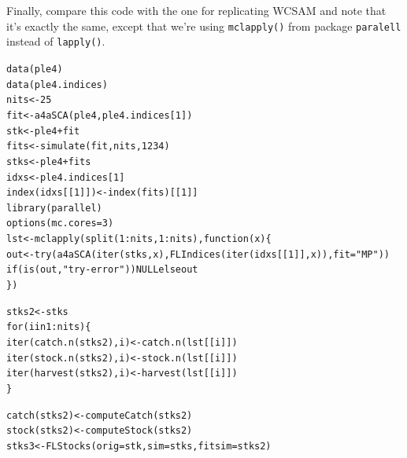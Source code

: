 \documentclass[a4paper,english,10pt]{article}\usepackage[]{graphicx}\usepackage[]{color}
\makeatletter
\newcommand{\hlnum}[1]{\textcolor[rgb]{0.2,0.2,0.2}{#1}}%
\newcommand{\hlstr}[1]{\textcolor[rgb]{0.2,0.2,0.2}{#1}}%
\newcommand{\hlopt}[1]{\textcolor[rgb]{0.2,0.2,0.2}{#1}}%
\newcommand{\hlstd}[1]{\textcolor[rgb]{0,0,0}{#1}}%
\newcommand{\hlkwa}[1]{\textcolor[rgb]{0.361,0.506,0.596}{#1}}%
\newcommand{\hlkwb}[1]{\textcolor[rgb]{0.361,0.506,0.596}{#1}}%
\newcommand{\hlkwc}[1]{\textcolor[rgb]{0.361,0.506,0.596}{#1}}%
\newcommand{\hlkwd}[1]{\textcolor[rgb]{0.361,0.506,0.596}{#1}}%
\newenvironment{kframe}{%
 \def\at@end@of@kframe{}%
 \ifinner\ifhmode%
  \def\at@end@of@kframe{\end{minipage}}%
  \begin{minipage}{\columnwidth}%
 \fi\fi%
 \def\FrameCommand##1{\hskip\@totalleftmargin \hskip-\fboxsep
 \colorbox{shadecolor}{##1}\hskip-\fboxsep
     \hskip-\linewidth \hskip-\@totalleftmargin \hskip\columnwidth}%
 \MakeFramed {\advance\hsize-\width
   \@totalleftmargin\z@ \linewidth\hsize
   \@setminipage}}%
 {\par\unskip\endMakeFramed%
 \at@end@of@kframe}
\newenvironment{knitrout}{}{} %
\newcommand{\code}[1]{{\texttt{#1}}}
\newcommand{\pkg}[1]{{\texttt{#1}}}
\makeatother
\begin{document}
Finally, compare this code with the one for replicating WCSAM and note that it's exactly the same, except that we're using \code{mclapply()} from package \pkg{paralell} instead of \code{lapply()}.

\begin{knitrout}
\color{fgcolor}\begin{kframe}
\begin{alltt}
\hlkwd{data}\hlstd{(ple4)}
\hlkwd{data}\hlstd{(ple4.indices)}
\hlstd{nits} \hlkwb{<-} \hlnum{25}
\hlstd{fit} \hlkwb{<-} \hlkwd{a4aSCA}\hlstd{(ple4, ple4.indices[}\hlnum{1}\hlstd{])}
\hlstd{stk} \hlkwb{<-} \hlstd{ple4} \hlopt{+} \hlstd{fit}
\hlstd{fits} \hlkwb{<-} \hlkwd{simulate}\hlstd{(fit, nits,} \hlnum{1234}\hlstd{)}
\hlstd{stks} \hlkwb{<-} \hlstd{ple4} \hlopt{+} \hlstd{fits}
\hlstd{idxs} \hlkwb{<-} \hlstd{ple4.indices[}\hlnum{1}\hlstd{]}
\hlkwd{index}\hlstd{(idxs[[}\hlnum{1}\hlstd{]])} \hlkwb{<-} \hlkwd{index}\hlstd{(fits)[[}\hlnum{1}\hlstd{]]}
\hlkwd{library}\hlstd{(parallel)}
\hlkwd{options}\hlstd{(}\hlkwc{mc.cores}\hlstd{=}\hlnum{3}\hlstd{)}
\hlstd{lst} \hlkwb{<-} \hlkwd{mclapply}\hlstd{(}\hlkwd{split}\hlstd{(}\hlnum{1}\hlopt{:}\hlstd{nits,} \hlnum{1}\hlopt{:}\hlstd{nits),} \hlkwa{function}\hlstd{(}\hlkwc{x}\hlstd{)\{}
        \hlstd{out} \hlkwb{<-} \hlkwd{try}\hlstd{(}\hlkwd{a4aSCA}\hlstd{(}\hlkwd{iter}\hlstd{(stks, x),} \hlkwd{FLIndices}\hlstd{(}\hlkwd{iter}\hlstd{(idxs[[}\hlnum{1}\hlstd{]], x)),} \hlkwc{fit}\hlstd{=}\hlstr{"MP"}\hlstd{))}
        \hlkwa{if}\hlstd{(}\hlkwd{is}\hlstd{(out,} \hlstr{"try-error"}\hlstd{))} \hlkwa{NULL else} \hlstd{out}
\hlstd{\})}

\hlstd{stks2} \hlkwb{<-} \hlstd{stks}
\hlkwa{for}\hlstd{(i} \hlkwa{in} \hlnum{1}\hlopt{:}\hlstd{nits)\{}
        \hlkwd{iter}\hlstd{(}\hlkwd{catch.n}\hlstd{(stks2), i)} \hlkwb{<-} \hlkwd{catch.n}\hlstd{(lst[[i]])}
        \hlkwd{iter}\hlstd{(}\hlkwd{stock.n}\hlstd{(stks2), i)} \hlkwb{<-} \hlkwd{stock.n}\hlstd{(lst[[i]])}
        \hlkwd{iter}\hlstd{(}\hlkwd{harvest}\hlstd{(stks2), i)} \hlkwb{<-} \hlkwd{harvest}\hlstd{(lst[[i]])}
\hlstd{\}}
\end{alltt}


{\ttfamily\noindent\bfseries{}}\begin{alltt}
\hlkwd{catch}\hlstd{(stks2)} \hlkwb{<-} \hlkwd{computeCatch}\hlstd{(stks2)}
\hlkwd{stock}\hlstd{(stks2)} \hlkwb{<-} \hlkwd{computeStock}\hlstd{(stks2)}
\hlstd{stks3} \hlkwb{<-} \hlkwd{FLStocks}\hlstd{(}\hlkwc{orig}\hlstd{=stk,} \hlkwc{sim}\hlstd{=stks,} \hlkwc{fitsim}\hlstd{=stks2)}
\end{alltt}
\end{kframe}
\end{knitrout}
\end{document}
